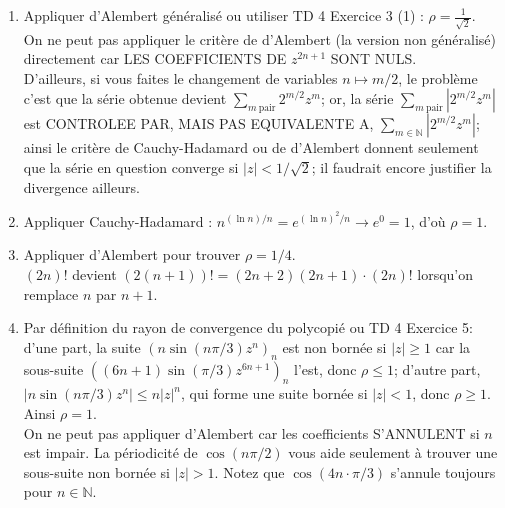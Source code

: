\documentclass[a4paper,10pt]{article}
\newcommand{\N}{\mathbb{N}}
\newcommand{\abs}[1]{\left|#1\right|}
\newcommand{\correction}[1]{{\color{red}#1}}
\newcommand{\comment}[1]{{\color{blue}#1}}
\begin{document}
\correction{
\begin{enumerate}[label=\alph*)]
    \item Appliquer d'Alembert généralisé ou utiliser TD 4 Exercice 3 (1) : $\rho=\frac{1}{\sqrt{2}}$.\\
    \comment{On ne peut pas appliquer le critère de d'Alembert (la version non généralisé) directement car LES COEFFICIENTS DE $z^{2n+1}$ SONT NULS.\\
    D'ailleurs, si vous faites le changement de variables $n\mapsto m/2$, le problème c'est que la série obtenue devient $\sum_{m~\text{pair}}2^{m/2}z^m$; or, la série $\sum_{m~\text{pair}}\abs{2^{m/2}z^m}$ est CONTROLEE PAR, MAIS PAS EQUIVALENTE A, $\sum_{m\in\N}\abs{2^{m/2}z^m}$; ainsi le critère de Cauchy-Hadamard ou de d'Alembert donnent seulement que la série en question converge si $\abs{z}<1/\sqrt{2}$; il faudrait encore justifier la divergence ailleurs.}
    \item Appliquer Cauchy-Hadamard :  $n^{(\ln n)/n}=e^{(\ln n)^2/n}\to e^0=1$, d'où $\rho=1$.
    \item Appliquer d'Alembert pour trouver $\rho=1/4$.\\
    \comment{$(2n)!$ devient $(2(n+1))!=(2n+2)(2n+1)\cdot(2n)!$ lorsqu'on remplace $n$ par $n+1$.}
    \item Par définition du rayon de convergence du polycopié ou TD 4 Exercice 5: d'une part, la suite $(n\sin(n\pi/3)z^n)_n$ est non bornée si $\abs{z}\geq1$ car la sous-suite $((6n+1)\sin(\pi/3)z^{6n+1})_n$ l'est, donc $\rho\leq 1$; d'autre part, $\abs{n\sin(n\pi/3)z^n}\leq n\abs{z}^n$, qui forme une suite bornée si $\abs{z}<1$, donc $\rho\geq1$. Ainsi $\rho=1$.\\
    \comment{On ne peut pas appliquer d'Alembert car les coefficients S'ANNULENT si $n$ est impair. La périodicité de $\cos(n\pi/2)$ vous aide seulement à trouver une sous-suite non bornée si $\abs{z}>1$. Notez que $\cos(4n\cdot\pi/3)$ s'annule toujours pour $n\in\N$.}
\end{enumerate}
}
\end{document}

